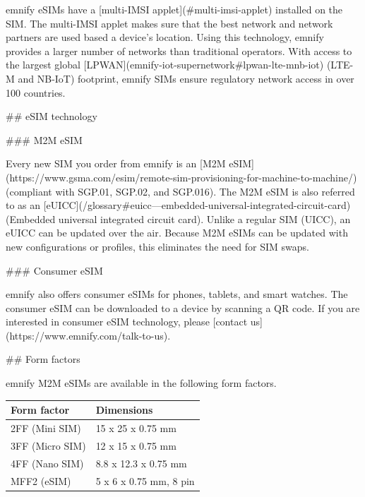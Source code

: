 \documentclass[11pt, oneside]{article}   	%
\begin{document}
\begin{markdown}

emnify eSIMs have a [multi-IMSI applet](#multi-imsi-applet) installed on the SIM.
The multi-IMSI applet makes sure that the best network and network partners are used based a device's location.
Using this technology, emnify provides a larger number of networks than traditional operators.
With access to the largest global [LPWAN](emnify-iot-supernetwork#lpwan-lte-mnb-iot) (LTE-M and NB-IoT) footprint, emnify SIMs ensure regulatory network access in over 100 countries.

## eSIM technology

### M2M eSIM

Every new SIM you order from emnify is an [M2M eSIM](https://www.gsma.com/esim/remote-sim-provisioning-for-machine-to-machine/) (compliant with SGP.01, SGP.02, and SGP.016).
The M2M eSIM is also referred to as an [eUICC](/glossary#euicc---embedded-universal-integrated-circuit-card) (Embedded universal integrated circuit card).
Unlike a regular SIM (UICC), an eUICC can be updated over the air.
Because M2M eSIMs can be updated with new configurations or profiles, this eliminates the need for SIM swaps.

### Consumer eSIM

emnify also offers consumer eSIMs for phones, tablets, and smart watches.
The consumer eSIM can be downloaded to a device by scanning a QR code.
If you are interested in consumer eSIM technology, please [contact us](https://www.emnify.com/talk-to-us).

\end{markdown}

\pagebreak[4]

\begin{markdown}

## Form factors

\end{markdown}

emnify M2M eSIMs are available in the following form factors.

\begin{table}[H]
\begin{tabular}{|l|l|}
\hline
\textbf{Form factor} & \textbf{Dimensions} \\ \hline
2FF (Mini SIM) & 15 x 25 x 0.75 mm \\ \hline
3FF (Micro SIM) & 12 x 15 x 0.75 mm \\ \hline
4FF (Nano SIM) & 8.8 x 12.3 x 0.75 mm \\ \hline
MFF2 (eSIM) & 5 x 6 x 0.75 mm, 8 pin \\ \hline
\end{tabular}%
\end{table}
\end{document}
